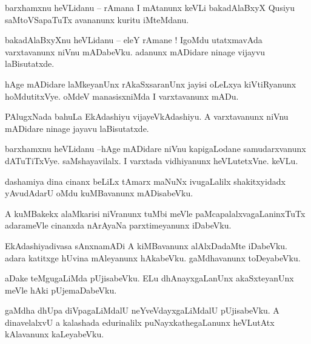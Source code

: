 \documentclass{article}
\begin{document}
\begin{mn}%
barxhamxnu heVLidanu -- rAmana I mAtanunx keVLi bakadAlaBxyX Qusiyu saMtoVSapaTuTx avananunx kuritu 
iMteMdanu.
\end{mn}

\begin{mn}%
bakadAlaBxyXnu heVLidanu -- eleY rAmane ! IgoMdu utatxmavAda varxtavanunx niVnu mADabeVku. adanunx 
mADidare ninage vijayvu laBisutatxde.
\end{mn}

\begin{mn}%
hAge mADidare laMkeyanUnx rAkaSxsaranUnx jayisi oLeLxya kiVtiRyanunx hoMdutitxVye. oMdeV 
manasisxniMda I varxtavanunx mADu.
\end{mn}

\begin{mn}%
PAlugxNada bahuLa EkAdashiyu vijayeVkAdashiyu. A varxtavanunx niVnu mADidare ninage jayavu 
laBisutatxde.
\end{mn}

\begin{mn}%
barxhamxnu heVLidanu --hAge mADidare niVnu kapigaLodane samudarxvanunx dATuTiTxVye. saMshayavilalx. 
I varxtada vidhiyanunx heVLutetxVne. keVLu.
\end{mn}

\begin{mn}%
dashamiya dina cinanx beLiLx tAmarx maNuNx ivugaLalilx shakitxyidadx yAvudAdarU oMdu kuMBavanunx 
mADisabeVku.
\end{mn}

\begin{mn}%
A kuMBakekx alaMkarisi niVranunx tuMbi meVle paMcapalalxvagaLaninxTuTx adarameVle cinanxda nArAyaNa 
parxtimeyanunx iDabeVku.
\end{mn}

\begin{mn}%
EkAdashiyadivasa sAnxnamADi A kiMBavanunx alAlxDadaMte iDabeVku. adara katitxge hUvina mAleyanunx 
hAkabeVku. gaMdhavanunx toDeyabeVku.
\end{mn}

\begin{mn}%
aDake teMgugaLiMda pUjisabeVku. ELu dhAnayxgaLanUnx akaSxteyanUnx meVle hAki pUjemaDabeVku.
\end{mn}

\begin{mn}%
gaMdha dhUpa diVpagaLiMdalU neYveVdayxgaLiMdalU pUjisabeVku. A dinavelalxvU a kalashada edurinalilx 
puNayxkathegaLanunx heVLutAtx kAlavanunx kaLeyabeVku.
\end{mn}
\end{document}
